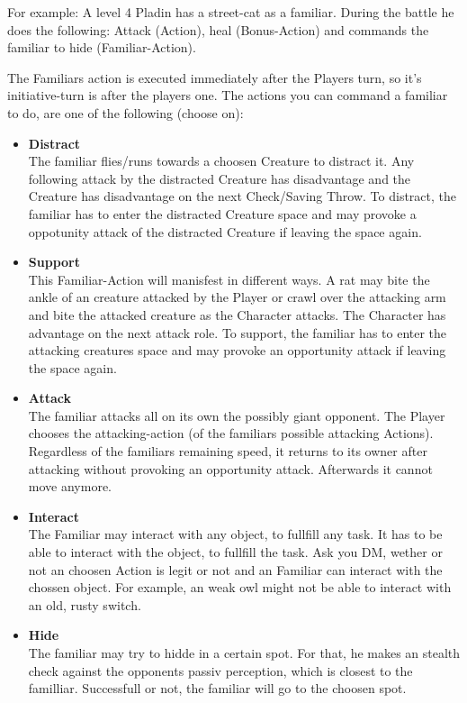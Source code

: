 For example: A level 4 Pladin has a street-cat as a familiar. During the battle he does the following: Attack (Action), heal (Bonus-Action) and commands the familiar to hide (Familiar-Action).

\newpage

The Familiars action is executed immediately after the Players turn, so it's initiative-turn is after the players one. The actions you can command a familiar to do, are one of the following (choose on):

\begin{itemize}
\item \textbf{Distract} \\ The familiar flies/runs towards a choosen Creature to distract it. Any following attack by the distracted Creature has disadvantage and the Creature has disadvantage on the next Check/Saving Throw. To distract, the familiar has to enter the distracted Creature space and may provoke a oppotunity attack of the distracted Creature if leaving the space again.
\item \textbf{Support} \\ This Familiar-Action will manisfest in different ways. A rat may bite the ankle of an creature attacked by the Player or crawl over the attacking arm and bite the attacked creature as the Character attacks. The Character has advantage on the next attack role. To support, the familiar has to enter the attacking creatures space and may provoke an opportunity attack if leaving the space again.
\item \textbf{Attack} \\ The familiar attacks all on its own the possibly giant opponent. The Player chooses the attacking-action (of the familiars possible attacking Actions). Regardless of the familiars remaining speed, it returns to its owner after attacking without provoking an opportunity attack. Afterwards it cannot move anymore.
\item \textbf{Interact} \\ The Familiar may interact with any object, to fullfill any task. It has to be able to interact with the object, to fullfill the task. Ask you DM, wether or not an choosen Action is legit or not and an Familiar can interact with the chossen object. For example, an weak owl might not be able to interact with an old, rusty switch.
\item \textbf{Hide} \\ The familiar may try to hidde in a certain spot. For that, he makes an stealth check against the opponents passiv perception, which is closest to the familliar. Successfull or not, the familiar will go to the choosen spot.
\end{itemize}

